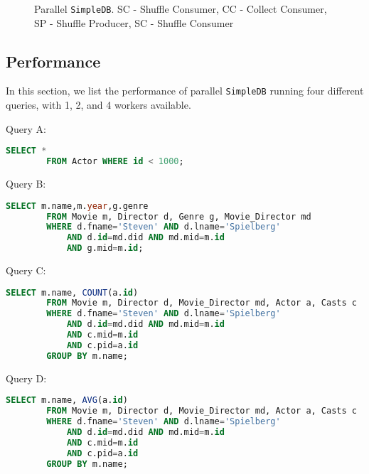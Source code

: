 \documentclass[12pt]{myland}
\def\<#1>{\texttt{#1}}
\begin{document}
\begin{figure}[t!]
        \caption{Parallel \<SimpleDB>. SC - Shuffle Consumer, CC - Collect Consumer, SP - Shuffle Producer, SC - Shuffle
        Consumer}
        \label{fig:para}
    \end{figure}

    \subsection{Performance}
    In this section, we list the performance of parallel \<SimpleDB> running four different queries, with 1, 2, and 4
    workers available.

    Query A:
    \begin{lstlisting}[language=SQL]
    SELECT *
        FROM Actor WHERE id < 1000;
    \end{lstlisting}

    Query B:
    \begin{lstlisting}[language=SQL]
    SELECT m.name,m.year,g.genre
        FROM Movie m, Director d, Genre g, Movie_Director md
        WHERE d.fname='Steven' AND d.lname='Spielberg'
            AND d.id=md.did AND md.mid=m.id
            AND g.mid=m.id;
    \end{lstlisting}

    Query C:
    \begin{lstlisting}[language=SQL]
    SELECT m.name, COUNT(a.id)
        FROM Movie m, Director d, Movie_Director md, Actor a, Casts c
        WHERE d.fname='Steven' AND d.lname='Spielberg'
            AND d.id=md.did AND md.mid=m.id
            AND c.mid=m.id
            AND c.pid=a.id
        GROUP BY m.name;
    \end{lstlisting}

    Query D:
    \begin{lstlisting}[language=SQL]
    SELECT m.name, AVG(a.id)
        FROM Movie m, Director d, Movie_Director md, Actor a, Casts c
        WHERE d.fname='Steven' AND d.lname='Spielberg'
            AND d.id=md.did AND md.mid=m.id
            AND c.mid=m.id
            AND c.pid=a.id
        GROUP BY m.name;
    \end{lstlisting}
\end{document}
